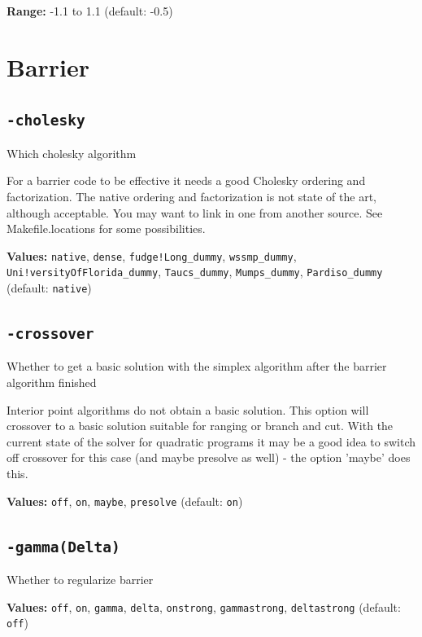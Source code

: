 \documentclass[11pt,a4paper]{article}
\begin{document}
\textbf{Range:} -1.1 to 1.1 (default: -0.5)

\section{Barrier}

\subsection*{\texttt{-cholesky}}

Which cholesky algorithm

For a barrier code to be effective it needs a good Cholesky ordering and factorization. The native ordering and factorization is not state of the art, although acceptable. You may want to link in one from another source.  See Makefile.locations for some possibilities.

\textbf{Values:} \texttt{native}, \texttt{dense}, \texttt{fudge!Long\_dummy}, \texttt{wssmp\_dummy}, \texttt{Uni!versityOfFlorida\_dummy}, \texttt{Taucs\_dummy}, \texttt{Mumps\_dummy}, \texttt{Pardiso\_dummy} (default: \texttt{native})

\subsection*{\texttt{-crossover}}

Whether to get a basic solution with the simplex algorithm after the barrier algorithm finished

Interior point algorithms do not obtain a basic solution. This option will crossover to a basic solution suitable for ranging or branch and cut. With the current state of the solver for quadratic programs it may be a good idea to switch off crossover for this case (and maybe presolve as well) - the option 'maybe' does this.

\textbf{Values:} \texttt{off}, \texttt{on}, \texttt{maybe}, \texttt{presolve} (default: \texttt{on})

\subsection*{\texttt{-gamma(Delta)}}

Whether to regularize barrier

\textbf{Values:} \texttt{off}, \texttt{on}, \texttt{gamma}, \texttt{delta}, \texttt{onstrong}, \texttt{gammastrong}, \texttt{deltastrong} (default: \texttt{off})
\end{document}

